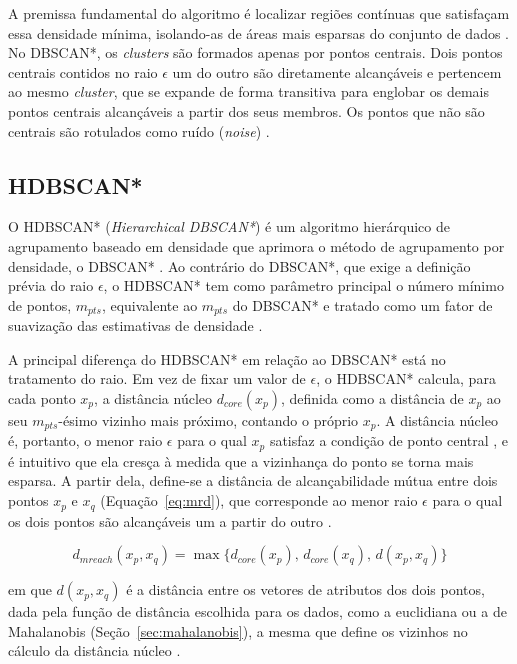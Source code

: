 \documentclass{uflamon}          %
\begin{document}
A premissa fundamental do algoritmo é localizar regiões contínuas que satisfaçam essa densidade mínima, isolando-as de áreas mais esparsas do conjunto de dados \cite{schubert2017}. No DBSCAN*, os \textit{clusters} são formados apenas por pontos centrais. Dois pontos centrais contidos no raio $\epsilon$ um do outro são diretamente alcançáveis e pertencem ao mesmo \textit{cluster}, que se expande de forma transitiva para englobar os demais pontos centrais alcançáveis a partir dos seus membros. Os pontos que não são centrais são rotulados como ruído (\textit{noise}) \cite{campello2015}.

\subsection{HDBSCAN*}
\label{sec:hdbscan}

O HDBSCAN* (\textit{Hierarchical DBSCAN*}) é um algoritmo hierárquico de agrupamento baseado em densidade que aprimora o método de agrupamento por densidade, o DBSCAN* \cite{campello2015}. Ao contrário do DBSCAN*, que exige a definição prévia do raio $\epsilon$, o HDBSCAN* tem como parâmetro principal o número mínimo de pontos, $m_{pts}$, equivalente ao $m_{pts}$ do DBSCAN* e tratado como um fator de suavização das estimativas de densidade \cite{campello2015}.

A principal diferença do HDBSCAN* em relação ao DBSCAN* está no tratamento do raio. Em vez de fixar um valor de $\epsilon$, o HDBSCAN* calcula, para cada ponto $x_p$, a distância núcleo $d_{core}(x_p)$, definida como a distância de $x_p$ ao seu $m_{pts}$-ésimo vizinho mais próximo, contando o próprio $x_p$. A distância núcleo é, portanto, o menor raio $\epsilon$ para o qual $x_p$ satisfaz a condição de ponto central \cite{campello2015}, e é intuitivo que ela cresça à medida que a vizinhança do ponto se torna mais esparsa. A partir dela, define-se a distância de alcançabilidade mútua entre dois pontos $x_p$ e $x_q$ (Equação~\ref{eq:mrd}), que corresponde ao menor raio $\epsilon$ para o qual os dois pontos são alcançáveis um a partir do outro \cite{campello2015}.

\begin{equation}
    d_{mreach}(x_p, x_q) = \max\{d_{core}(x_p),\, d_{core}(x_q),\, d(x_p, x_q)\}
    \label{eq:mrd}
\end{equation}

em que $d(x_p, x_q)$ é a distância entre os vetores de atributos dos dois pontos, dada pela função de distância escolhida para os dados, como a euclidiana ou a de Mahalanobis (Seção~\ref{sec:mahalanobis}), a mesma que define os vizinhos no cálculo da distância núcleo \cite{campello2015}.
\end{document}
